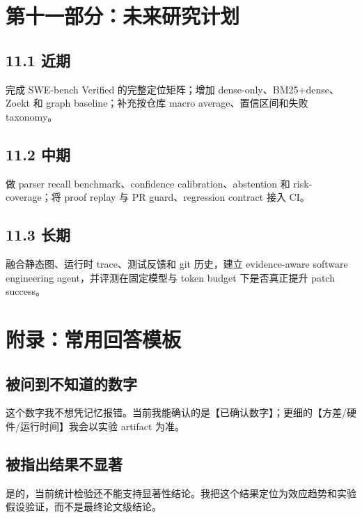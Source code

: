 \documentclass[UTF8,12pt,openany]{ctexbook}
\begin{document}
\clearpage
\chapter{第十一部分：未来研究计划}

\section{11.1 近期}

完成 SWE-bench Verified 的完整定位矩阵；增加 dense-only、BM25+dense、Zoekt 和 graph baseline；补充按仓库 macro average、置信区间和失败 taxonomy。\par

\section{11.2 中期}

做 parser recall benchmark、confidence calibration、abstention 和 risk-coverage；将 proof replay 与 PR guard、regression contract 接入 CI。\par

\section{11.3 长期}

融合静态图、运行时 trace、测试反馈和 git 历史，建立 evidence-aware software engineering agent，并评测在固定模型与 token budget 下是否真正提升 patch success。\par

\clearpage
\chapter{附录：常用回答模板}

\section{被问到不知道的数字}

这个数字我不想凭记忆报错。当前我能确认的是【已确认数字】；更细的【方差/硬件/运行时间】我会以实验 artifact 为准。\par

\section{被指出结果不显著}

是的，当前统计检验还不能支持显著性结论。我把这个结果定位为效应趋势和实验假设验证，而不是最终论文级结论。\par
\end{document}
